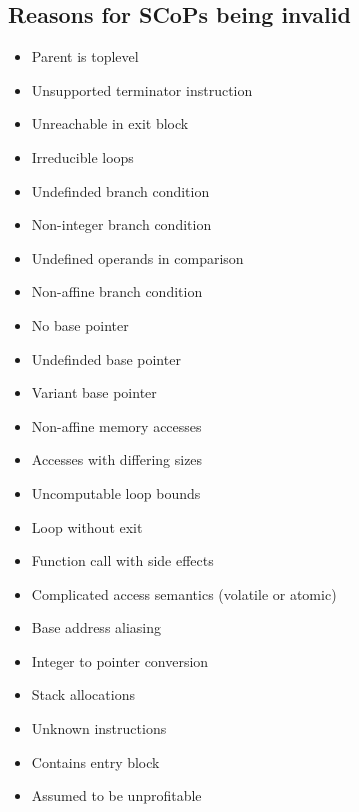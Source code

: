 \subsection{Reasons for SCoPs being invalid}
\begin{itemize}
    \item Parent is toplevel
        
    \item Unsupported terminator instruction
    \item Unreachable in exit block
        
    \item Irreducible loops
        
    \item Undefinded branch condition
    \item Non-integer branch condition
    \item Undefined operands in comparison
    \item Non-affine branch condition
    \item No base pointer
    \item Undefinded base pointer
    \item Variant base pointer
        
    \item Non-affine memory accesses
        
    \item Accesses with differing sizes
    \item Uncomputable loop bounds
        
    \item Loop without exit
        
    \item Function call with side effects
        
    \item Complicated access semantics (volatile or atomic)
    \item Base address aliasing
        
    \item Integer to pointer conversion
        
    \item Stack allocations
    \item Unknown instructions
    \item Contains entry block
    \item Assumed to be unprofitable
        
\end{itemize}

